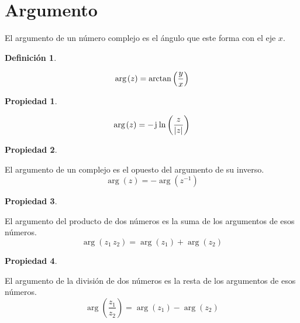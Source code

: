 \documentclass[a5paper,12pt,twoside]{book}
\newtheorem{defn}{{Definición}}[chapter]
\newtheorem{prop}{{Propiedad}}[chapter]
\begin{document}
\section{Argumento}

El argumento de un número complejo es el ángulo que este forma con el eje $x$.

\begin{mdframed}[style=DefinitionFrame]
    \begin{defn}
    \end{defn}
    \begin{equation*}
        \mathop{\mathrm{arg}}\mkern2mu(z) = \arctan \left(\frac{y}{x}\right)
    \end{equation*}
\end{mdframed}

\begin{mdframed}[style=PropertyFrame]
    \begin{prop}
    \end{prop}
    \begin{equation*}
        \mathop{\mathrm{arg}}\mkern2mu(z) = - \mkern2mu\mathrm{j}\mkern1mu \ln \left( \frac{z}{{\left| {z} \right|}} \right)
    \end{equation*}
\end{mdframed}

\begin{mdframed}[style=PropertyFrame]
    \begin{prop}
    \end{prop}
    El argumento de un complejo es el opuesto del argumento de su inverso.
    \begin{equation*}
        \arg(z) = - \arg(z^{-1})
    \end{equation*}
\end{mdframed}

\begin{mdframed}[style=PropertyFrame]
    \begin{prop}
    \end{prop}
    El argumento del producto de dos números es la suma de los argumentos de esos números.
    \begin{equation*}
        \arg (z_1 \, z_2) = \arg(z_1) + \arg(z_2)
    \end{equation*}
\end{mdframed}

\begin{mdframed}[style=PropertyFrame]
    \begin{prop}
    \end{prop}
    El argumento de la división de dos números es la resta de los argumentos de esos números.
    \begin{equation*}
        \arg \left( \dfrac{z_1}{z_2} \right) = \arg(z_1) - \arg(z_2)
    \end{equation*}
\end{mdframed}
\end{document}
